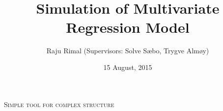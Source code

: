 \documentclass[9pt, final]{beamer}\usepackage[]{graphicx}\usepackage[]{color}
\title{Simulation of Multivariate Regression Model}
\author{Raju Rimal (Supervisors: Solve S{\ae}bo, Trygve Alm{\o}y)}
\institute[Norwegian University of Life Sciences (NMBU)]{Norwegian University of Life Sciences (NMBU), {\AA}s, Norway}
\date[15 August, 2015]{15 August, 2015}
\begin{document}
\begin{frame}[fragile]


\begin{center}
	\Huge \textsc{Simple tool for complex structure}
\end{center}

\vfill
\end{frame}
\end{document}
